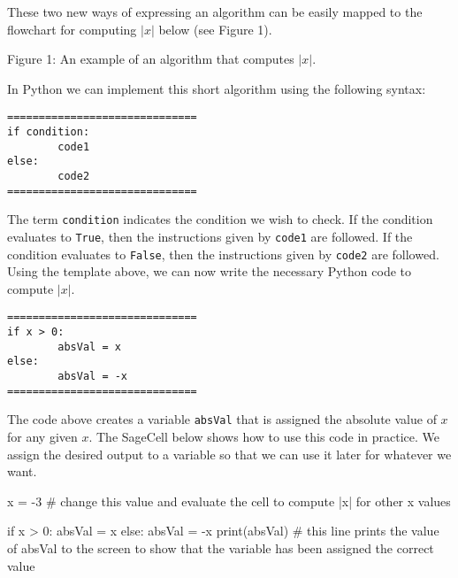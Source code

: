\documentclass{ximera}
\begin{document}
These two new ways of expressing an algorithm can be easily mapped to the flowchart for computing $|x|$ below (see Figure 1).

\begin{center}
\end{center}
\begin{center}
    Figure 1: An example of an algorithm that computes $|x|$.
\end{center}


In Python we can implement this short algorithm using the following syntax:

\begin{verbatim}
==============================
if condition:
        code1
else:
        code2
==============================
\end{verbatim}

The term \verb|condition| indicates the condition we wish to check. If the condition evaluates to \verb|True|, then the instructions given by \verb|code1| are followed. If the condition evaluates to \verb|False|, then the instructions given by \verb|code2| are followed. Using the template above, we can now write the necessary Python code to compute $|x|$.

\begin{verbatim}
==============================
if x > 0:
        absVal = x
else:
        absVal = -x
==============================
\end{verbatim}

The code above creates a variable \verb|absVal| that is assigned the absolute value of $x$ for any given $x$. The SageCell below shows how to use this code in practice. We assign the desired output to a variable so that we can use it later for whatever we want.

\begin{sageCell}
x = -3               # change this value and evaluate the cell to compute |x| for other x values

if x > 0:
	absVal = x
else:
	absVal = -x
print(absVal)        # this line prints the value of absVal to the screen to show that the variable has been assigned the correct value
\end{sageCell}
\end{document}
